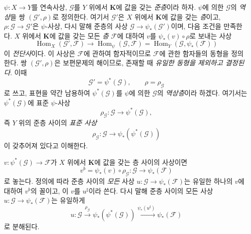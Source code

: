 \begin{env}[3.5.3]
\label{0.3.5.3-ko}
$\psi:X\to Y$를 연속사상, $\mathcal G$를 $Y$ 위에서 $\mathbf K$에 값을 갖는 \emph{준층}이라 하자. $\psi$에 의한 $\mathcal G$의 \emph{역상}을 쌍 $(\mathcal G',\rho)$로 정의한다. 여기서 $\mathcal G'$은 $X$ 위에서 $\mathbf K$에 값을 갖는 \emph{층}이고, $\rho:\mathcal G\to\mathcal G'$은 $\psi$-사상, 다시 말해 준층의 사상 $\mathcal G\to\psi_*(\mathcal G')$이며, 다음 조건을 만족한다. $X$ 위에서 $\mathbf K$에 값을 갖는 모든 \emph{층} $\mathcal F$에 대하여 $v$를 $\psi_*(v)\circ\rho$로 보내는 사상
\begin{equation*}
  \operatorname{Hom}_X(\mathcal G',\mathcal F)
  \longrightarrow \operatorname{Hom}_\psi(\mathcal G,\mathcal F)
  =\operatorname{Hom}_Y(\mathcal G,\psi_*(\mathcal F))
\tag{3.5.3.1}\label{0.3.5.3.1-ko}
\end{equation*}
이 \emph{전단사}이다. 이 사상은 $\mathcal F$에 관하여 함자적이므로 $\mathcal F$에 관한 함자들의 동형을 정의한다. 쌍 $(\mathcal G',\rho)$은 보편문제의 해이므로, 존재할 때 \emph{유일한 동형을 제외하고 결정된다}. 이때
\[
  \mathcal G'=\psi^*(\mathcal G),
  \qquad
  \rho=\rho_{\mathcal G}
\]
로 쓰고, 표현을 약간 남용하여 $\psi^*(\mathcal G)$를 $\psi$에 의한 $\mathcal G$의 \emph{역상층}이라 하겠다. 여기서는 $\psi^*(\mathcal G)$에 표준 $\psi$-사상
\[
  \rho_{\mathcal G}:\mathcal G\longrightarrow\psi^*(\mathcal G),
\]
즉 $Y$ 위의 준층 사이의 \emph{표준 사상}
\begin{equation*}
  \rho_{\mathcal G}:\mathcal G
  \longrightarrow\psi_*(\psi^*(\mathcal G))
\tag{3.5.3.2}\label{0.3.5.3.2-ko}
\end{equation*}
이 갖추어져 있다고 이해한다.

$v:\psi^*(\mathcal G)\to\mathcal F$가 $X$ 위에서 $\mathbf K$에 값을 갖는 층 사이의 사상이면
\[
  v^b=\psi_*(v)\circ\rho_{\mathcal G}:
  \mathcal G\longrightarrow\psi_*(\mathcal F)
\]
로 놓는다. 정의에 따라 준층 사이의 \emph{모든} 사상 $u:\mathcal G\to\psi_*(\mathcal F)$는 유일한 하나의 $v$에 대하여 $v^b$의 꼴이고, 이 $v$를 $u^\sharp$이라 쓴다. 다시 말해 준층 사이의 모든 사상 $u:\mathcal G\to\psi_*(\mathcal F)$는 유일하게
\begin{equation*}
  u:\mathcal G\xrightarrow{\rho_{\mathcal G}}
  \psi_*(\psi^*(\mathcal G))
  \xrightarrow{\psi_*(u^\sharp)}\psi_*(\mathcal F)
\tag{3.5.3.3}\label{0.3.5.3.3-ko}
\end{equation*}
로 분해된다.
\end{env}


